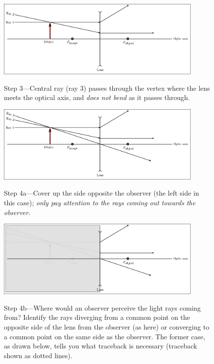 \documentclass[letterpaper,10pt]{article}
\newenvironment{myindentpar}[1]
{\begin{list}{}
	{\setlength{\leftmargin}{#1}}
	\setlength{\parskip}{10pt}
	\item[]
}
{\end{list}}
\begin{document}
{\begin{myindentpar}{20pt}
\begin{figure}[htb]
  	{\includegraphics[width=4in,left]{ray_diagram_howto_step09_ray2b.pdf}}
 \end{figure}
 \begin{figure}[htb]
   {Step 3---Central ray (ray 3) passes through the vertex where the lens meets the optical axis, and \textit{does not bend} as it passes through.}

  	{\includegraphics[width=4in,left]{ray_diagram_howto_step10_ray3.pdf}}
 \end{figure}
 \begin{figure}[htb]
   {Step 4a---Cover up the side opposite the observer (the left side in this case); \textit{only pay attention to the rays coming out towards the observer}.}

  	{\includegraphics[width=4in,left]{ray_diagram_howto_step11_cover_left.pdf}}
 \end{figure}
 \begin{figure}[htb]
   {Step 4b---Where would an observer perceive the light rays coming from? Identify the rays diverging from a common point on the opposite side of the lens from the observer (as here) or converging to a common point on the same side as the observer.
   The former case, as drawn below, tells you what traceback is necessary (traceback shown as dotted lines).}


\end{figure}
\end{myindentpar}}
\end{document}
